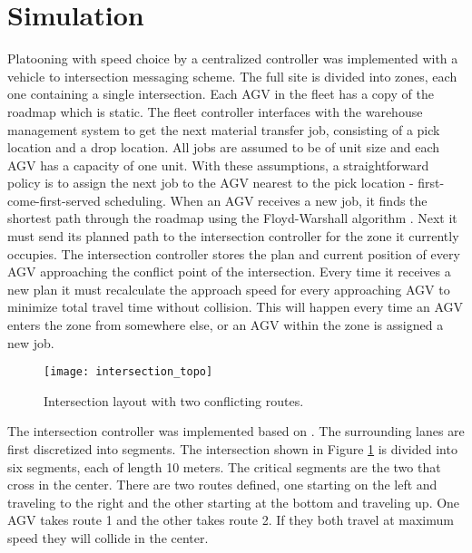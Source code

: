  


\section{Simulation}

Platooning with speed choice by a centralized controller was implemented with a vehicle to intersection messaging scheme. The full site is divided into zones, each one containing a single intersection. Each AGV in the fleet has a copy of the roadmap which is  static. The fleet controller interfaces with the warehouse management system to get the next material transfer job, consisting of a pick location and a drop location. All jobs are assumed to be of unit size and each AGV has a capacity of one unit. With these assumptions, a straightforward policy is to assign the next job to the AGV nearest to the pick location - first-come-first-served scheduling. When an AGV receives a new job, it finds the shortest path through the roadmap using the Floyd-Warshall algorithm \cite{Djojo2013}. Next it must send its planned path to the intersection controller for the zone it currently occupies. The intersection controller stores the plan and current position of every AGV approaching the conflict point of the intersection. Every time it receives a new plan it must recalculate the approach speed for every approaching AGV to minimize total travel time without collision. This will happen every time an AGV enters the zone from somewhere else, or an AGV within the zone is assigned a new job.

\begin{figure}[ht]
	\centering
	\texttt{[image: intersection\_topo]}
	\caption{Intersection layout with two conflicting routes.}
	\label{fig:layout}
\end{figure}

The intersection controller was implemented based on \cite{Digani2019}. The surrounding lanes are first discretized into segments. The intersection shown in Figure \ref{fig:layout} is divided into six segments, each of length 10 meters. The critical segments are the two that cross in the center. There are two routes defined, one starting on the left and traveling to the right and the other starting at the bottom and traveling up. One AGV takes route 1 and the other takes route 2. If they both travel at maximum speed they will collide in the center.

